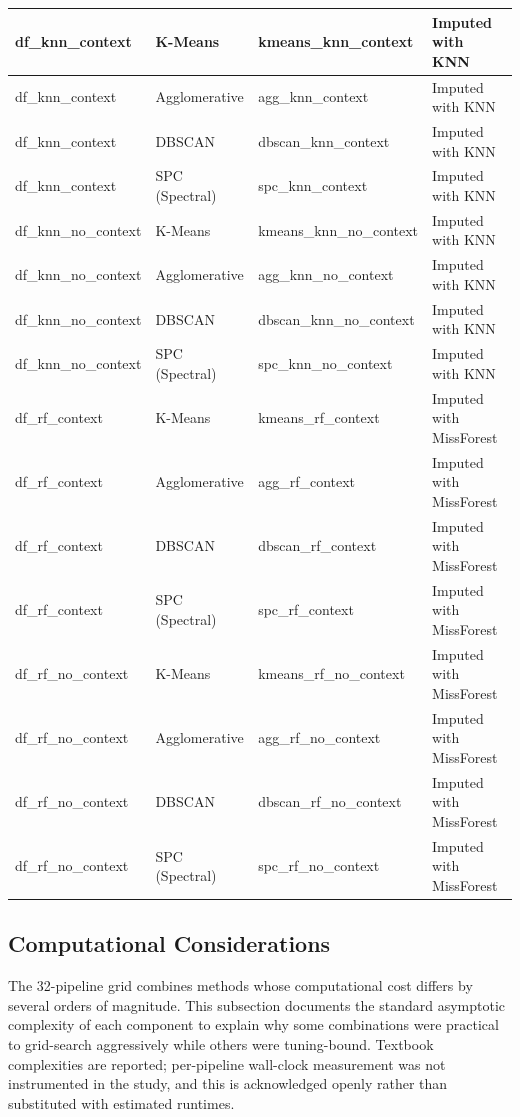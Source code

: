 \begin{table}[!ht]
{\begin{tabular}{|l|l|l|l|}
df\_knn\_context & K-Means & kmeans\_knn\_context & Imputed with KNN \\ \hline
df\_knn\_context & Agglomerative & agg\_knn\_context & Imputed with KNN \\ \hline
df\_knn\_context & DBSCAN & dbscan\_knn\_context & Imputed with KNN \\ \hline
df\_knn\_context & SPC (Spectral) & spc\_knn\_context & Imputed with KNN \\ \hline
df\_knn\_no\_context & K-Means & kmeans\_knn\_no\_context & Imputed with KNN \\ \hline
df\_knn\_no\_context & Agglomerative & agg\_knn\_no\_context & Imputed with KNN \\ \hline
df\_knn\_no\_context & DBSCAN & dbscan\_knn\_no\_context & Imputed with KNN \\ \hline
df\_knn\_no\_context & SPC (Spectral) & spc\_knn\_no\_context & Imputed with KNN \\ \hline
df\_rf\_context & K-Means & kmeans\_rf\_context & Imputed with MissForest \\ \hline
df\_rf\_context & Agglomerative & agg\_rf\_context & Imputed with MissForest \\ \hline
df\_rf\_context & DBSCAN & dbscan\_rf\_context & Imputed with MissForest \\ \hline
df\_rf\_context & SPC (Spectral) & spc\_rf\_context & Imputed with MissForest \\ \hline
df\_rf\_no\_context & K-Means & kmeans\_rf\_no\_context & Imputed with MissForest \\ \hline
df\_rf\_no\_context & Agglomerative & agg\_rf\_no\_context & Imputed with MissForest \\ \hline
df\_rf\_no\_context & DBSCAN & dbscan\_rf\_no\_context & Imputed with MissForest \\ \hline
df\_rf\_no\_context & SPC (Spectral) & spc\_rf\_no\_context & Imputed with MissForest \\ \hline
\end{tabular}
}
\end{table}

\subsection{Computational Considerations}\label{sec:computational_considerations}

The 32-pipeline grid combines methods whose computational cost differs by several orders of magnitude. This subsection documents the standard asymptotic complexity of each component to explain why some combinations were practical to grid-search aggressively while others were tuning-bound. Textbook complexities are reported; per-pipeline wall-clock measurement was not instrumented in the study, and this is acknowledged openly rather than substituted with estimated runtimes.

